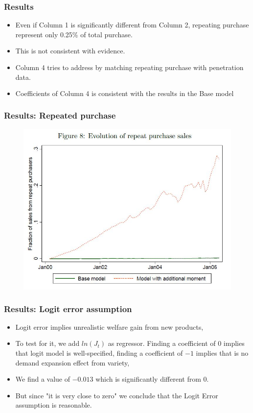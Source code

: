 \documentclass{beamer}
\theoremstyle{definition}
\begin{document}
\begin{frame}
  \frametitle{Results}

  \begin{itemize}
    \item Even if Column 1 is significantly different from Column 2, repeating
      purchase represent only 0.25\% of total purchase.
    \item This is not consistent with evidence.
    \item Column 4 tries to address by matching repeating purchase with
      penetration data.
    \item Coefficients of Column 4 is consistent with the results in the Base model
  \end{itemize}
\end{frame}

\begin{frame}
  \frametitle{Results: Repeated purchase}

  \begin{figure}
    \includegraphics[width=\linewidth]{8.JPG}
  \end{figure}
\end{frame}

\begin{frame}
  \frametitle{Results: Logit error assumption}

  \begin{itemize}
    \item Logit error implies unrealistic welfare gain from new products,
    \item To test for it, we add $ln(J_t)$ as regressor. Finding a coefficient of $0$
      implies that logit model is well-specified, finding a coefficient of $-1$
      implies that is no demand expansion effect from variety,
    \item We find a value of $-0.013$ which is significantly different from $0$.
    \item But since "it is very close to zero" we conclude that the Logit Error
      assumption is reasonable.
  \end{itemize}
\end{frame}
\end{document}

